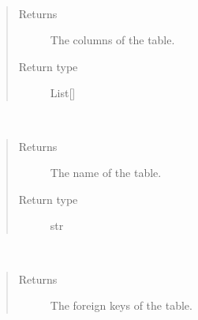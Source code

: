 \documentclass[letterpaper,10pt,english]{sphinxmanual}
\begin{document}
\begin{fulllineitems}
\begin{fulllineitems}
\label{\detokenize{model:mini_sql.model.table.Table.get_columns}}~\begin{quote}\begin{description}
\item[{Returns}] \leavevmode
\sphinxAtStartPar
The columns of the table.

\item[{Return type}] \leavevmode
\sphinxAtStartPar
List{[}{\hyperref[\detokenize{model:mini_sql.model.column.Column}]{}}{]}

\end{description}\end{quote}

\end{fulllineitems}


\begin{fulllineitems}
\label{\detokenize{model:mini_sql.model.table.Table.get_name}}~\begin{quote}\begin{description}
\item[{Returns}] \leavevmode
\sphinxAtStartPar
The name of the table.

\item[{Return type}] \leavevmode
\sphinxAtStartPar
str

\end{description}\end{quote}

\end{fulllineitems}


\begin{fulllineitems}
\label{\detokenize{model:mini_sql.model.table.Table.get_references}}~\begin{quote}\begin{description}
\item[{Returns}] \leavevmode
\sphinxAtStartPar
The foreign keys of the table.


\end{description}
\end{quote}
\end{fulllineitems}
\end{fulllineitems}
\end{document}
